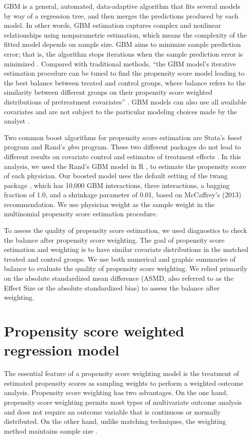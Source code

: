 \documentclass[12pt]{report}
\begin{document}
GBM is a general, automated, data-adaptive algorithm that fits several models by way of a regression tree, and then merges the predictions produced by each model. In other words, GBM estimation captures complex and nonlinear relationships using nonparametric estimation, which means the complexity of the fitted model depends on sample size. GBM aims to minimize sample prediction error; that is, the algorithm stops iterations when the sample prediction error is minimized \citep{guo2014propensity}. Compared with traditional methods, ``the GBM model's iterative estimation procedure can be tuned to find the propensity score model leading to the best balance between treated and control groups, where balance refers to the similarity between different groups on their propensity score weighted distributions of pretreatment covariates''  \citep{mccaffrey2013tutorial}. GBM models can also use all available covariates and are not subject to the particular modeling choices made by the analyst \citep{hillm2015short}. 

Two common boost algorithms for propensity score estimation are Stata's \textit{boost} program and Rand's \textit{gbm} program. These two different packages do not lead to different results on covariate control and estimates of treatment effects \citep{guo2014propensity}. In this analysis, we used the Rand's GBM model \citep{mccaffrey2004propensity} in R \citep{rbase}, to estimate the propensity score of each physician. Our boosted model uses the default setting of the twang package \citep{mccaffrey2013tutorial}, which has 10,000 GBM interactions, three interactions, a bagging fraction of 1.0, and a shrinkage parameter of 0.01, based on McCaffrey's (2013) recommendation. We use physician weight as the sample weight in the multinomial propensity score estimation procedure.

To assess the quality of propensity score estimation, we used diagnostics to check the balance after propensity score weighting. The goal of propensity score estimation and weighting is to have similar covariate distributions in the matched treated and control groups. We use both numerical and graphic summaries of balance to evaluate the quality of propensity score weighting. We relied primarily on the absolute standardized mean difference (ASMD, also referred to as the Effect Size or the absolute standardized bias) to assess the balance after weighting. 

\section{Propensity score weighted regression model}
\label{sec:model}
The essential feature of a propensity score weighting model is the treatment of estimated propensity scores as sampling weights to perform a weighted outcome analysis. Propensity score weighting has two advantages. On the one hand, propensity score weighting permits most types of multivariate outcome analysis and does not require an outcome variable that is continuous or normally distributed. On the other hand, unlike matching techniques, the weighting method maintains sample size \citep{guo2014propensity}.
\end{document}
